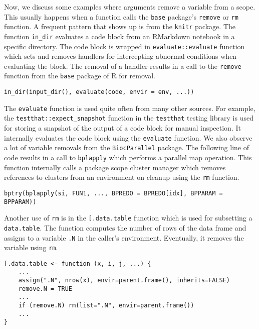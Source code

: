 \documentclass[review,nonacm,screen,acmsmall,anonymous=true]{acmart}
\newcommand{\code}[1]{\lstinline |#1|\xspace}
\begin{document}
Now, we discuss some examples where arguments remove a variable from a scope.
This usually happens when a function calls the \code{base} package's
\code{remove} or \code{rm} function.
%
A frequent pattern that shows up is from the \code{knitr} package. The function
\code{in_dir} evaluates a code block from an RMarkdown notebook in a specific
directory. The code block is wrapped in \code{evaluate::evaluate} function which
sets and removes handlers for intercepting abnormal conditions when evaluating
the block. The removal of a handler results in a call to the \code{remove}
function from the \code{base} package of R for removal.
%
\begin{lstlisting}
in_dir(input_dir(), evaluate(code, envir = env, ...))
\end{lstlisting}
%
The \code{evaluate} function is used quite often from many other sources. For
example, the \code{testthat::expect_snapshot} function in the \code{testthat}
testing library is used for storing a snapshot of the output of a code block for
manual inspection. It internally evaluates the code block using the
\code{evaluate} function.
%
We also observe a lot of variable removals from the \code{BiocParallel} package.
The following line of code results in a call to \code{bplapply} which performs a
parallel map operation. This function internally calls a package scope cluster
manager which removes references to clusters from an environment on cleanup
using the \code{rm} function.
%
\begin{lstlisting}
bptry(bplapply(si, FUN1, ..., BPREDO = BPREDO[idx], BPPARAM = BPPARAM))
\end{lstlisting}

Another use of \code{rm} is in the \code{[.data.table} function which is used
for subsetting a \code{data.table}. The function computes the number of rows of
the data frame and assigns to a variable \code{.N} in the caller's environment.
Eventually, it removes the variable using \code{rm}.
%
\begin{lstlisting}
[.data.table <- function (x, i, j, ...) {
    ...
    assign(".N", nrow(x), envir=parent.frame(), inherits=FALSE)
    remove.N = TRUE
    ...
    if (remove.N) rm(list=".N", envir=parent.frame())
    ...
}
\end{lstlisting}
\end{document}
